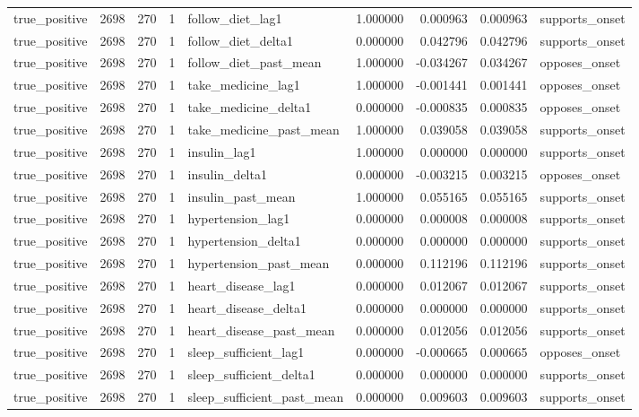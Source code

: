 \begin{longtable}{lrrrlrrrl}
true\_positive & 2698 & 270 & 1 & follow\_diet\_lag1 & 1.000000 & 0.000963 & 0.000963 & supports\_onset \\
true\_positive & 2698 & 270 & 1 & follow\_diet\_delta1 & 0.000000 & 0.042796 & 0.042796 & supports\_onset \\
true\_positive & 2698 & 270 & 1 & follow\_diet\_past\_mean & 1.000000 & -0.034267 & 0.034267 & opposes\_onset \\
true\_positive & 2698 & 270 & 1 & take\_medicine\_lag1 & 1.000000 & -0.001441 & 0.001441 & opposes\_onset \\
true\_positive & 2698 & 270 & 1 & take\_medicine\_delta1 & 0.000000 & -0.000835 & 0.000835 & opposes\_onset \\
true\_positive & 2698 & 270 & 1 & take\_medicine\_past\_mean & 1.000000 & 0.039058 & 0.039058 & supports\_onset \\
true\_positive & 2698 & 270 & 1 & insulin\_lag1 & 1.000000 & 0.000000 & 0.000000 & supports\_onset \\
true\_positive & 2698 & 270 & 1 & insulin\_delta1 & 0.000000 & -0.003215 & 0.003215 & opposes\_onset \\
true\_positive & 2698 & 270 & 1 & insulin\_past\_mean & 1.000000 & 0.055165 & 0.055165 & supports\_onset \\
true\_positive & 2698 & 270 & 1 & hypertension\_lag1 & 0.000000 & 0.000008 & 0.000008 & supports\_onset \\
true\_positive & 2698 & 270 & 1 & hypertension\_delta1 & 0.000000 & 0.000000 & 0.000000 & supports\_onset \\
true\_positive & 2698 & 270 & 1 & hypertension\_past\_mean & 0.000000 & 0.112196 & 0.112196 & supports\_onset \\
true\_positive & 2698 & 270 & 1 & heart\_disease\_lag1 & 0.000000 & 0.012067 & 0.012067 & supports\_onset \\
true\_positive & 2698 & 270 & 1 & heart\_disease\_delta1 & 0.000000 & 0.000000 & 0.000000 & supports\_onset \\
true\_positive & 2698 & 270 & 1 & heart\_disease\_past\_mean & 0.000000 & 0.012056 & 0.012056 & supports\_onset \\
true\_positive & 2698 & 270 & 1 & sleep\_sufficient\_lag1 & 0.000000 & -0.000665 & 0.000665 & opposes\_onset \\
true\_positive & 2698 & 270 & 1 & sleep\_sufficient\_delta1 & 0.000000 & 0.000000 & 0.000000 & supports\_onset \\
true\_positive & 2698 & 270 & 1 & sleep\_sufficient\_past\_mean & 0.000000 & 0.009603 & 0.009603 & supports\_onset \\

\end{longtable}
